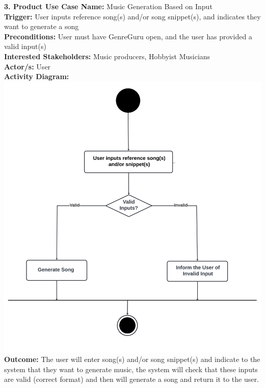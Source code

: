 \documentclass[12pt]{article}
\begin{document}
\noindent \textbf{3. Product Use Case Name:} Music Generation Based on Input \\
\textbf{Trigger:} User inputs reference song(s) and/or song snippet(s), and indicates they want to generate a song \\
\textbf{Preconditions:} User must have GenreGuru open, and the user has provided a valid input(s) \\
\textbf{Interested Stakeholders:} Music producers, Hobbyist Musicians \\
\textbf{Actor/s:} User \\
\textbf{Activity Diagram:} \\
\includegraphics[width=\textwidth]{generate_song.png} \\
\textbf{Outcome:} The user will enter song(s) and/or song snippet(s) and indicate to the system that they want to generate music, the system will check that these inputs are valid (correct format) and then will generate a song and return it to the user.

\vspace{1cm}
\end{document}
